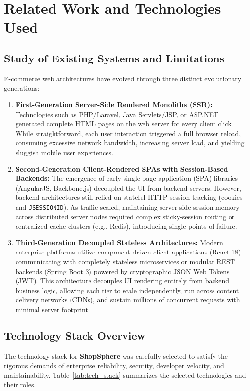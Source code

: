 \chapter{Related Work and Technologies Used}
\label{ch:technologies}

\section{Study of Existing Systems and Limitations}
E-commerce web architectures have evolved through three distinct evolutionary generations:
\begin{enumerate}[leftmargin=2.0em]
    \item \textbf{First-Generation Server-Side Rendered Monoliths (SSR):} Technologies such as PHP/Laravel, Java Servlets/JSP, or ASP.NET generated complete HTML pages on the web server for every client click. While straightforward, each user interaction triggered a full browser reload, consuming excessive network bandwidth, increasing server load, and yielding sluggish mobile user experiences.
    \item \textbf{Second-Generation Client-Rendered SPAs with Session-Based Backends:} The emergence of early single-page application (SPA) libraries (AngularJS, Backbone.js) decoupled the UI from backend servers. However, backend architectures still relied on stateful HTTP session tracking (cookies and \texttt{JSESSIONID}). As traffic scaled, maintaining server-side session memory across distributed server nodes required complex sticky-session routing or centralized cache clusters (e.g., Redis), introducing single points of failure.
    \item \textbf{Third-Generation Decoupled Stateless Architectures:} Modern enterprise platforms utilize component-driven client applications (React 18) communicating with completely stateless microservices or modular REST backends (Spring Boot 3) powered by cryptographic JSON Web Tokens (JWT). This architecture decouples UI rendering entirely from backend business logic, allowing each tier to scale independently, run across content delivery networks (CDNs), and sustain millions of concurrent requests with minimal server footprint.
\end{enumerate}

\section{Technology Stack Overview}
The technology stack for \textbf{ShopSphere} was carefully selected to satisfy the rigorous demands of enterprise reliability, security, developer velocity, and maintainability. Table~\ref{tab:tech_stack} summarizes the selected technologies and their roles.

